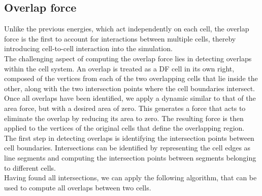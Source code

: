 \subsection{Overlap force}
Unlike the previous energies, which act independently on each cell, the overlap force is the first to account for interactions between multiple cells, thereby introducing cell-to-cell interaction into the simulation. \\
The challenging aspect of computing the overlap force lies in detecting overlaps within the cell system. 
An overlap is treated as a DF cell in its own right, composed of the vertices from each of the two overlapping cells that lie inside the other, along with the two intersection points where the cell boundaries intersect. \\ 
Once all overlaps have been identified, we apply a dynamic similar to that of the area force, but with a desired area of zero. 
This generates a force that acts to eliminate the overlap by reducing its area to zero. 
The resulting force is then applied to the vertices of the original cells that define the overlapping region. \\
The first step in detecting overlaps is identifying the intersection points between cell boundaries.
Intersections can be identified by representing the cell edges as line segments and computing the intersection points between segments belonging to different cells. \\
Having found all intersections, we can apply the following algorithm, that can be used to compute all overlaps between two cells. 

